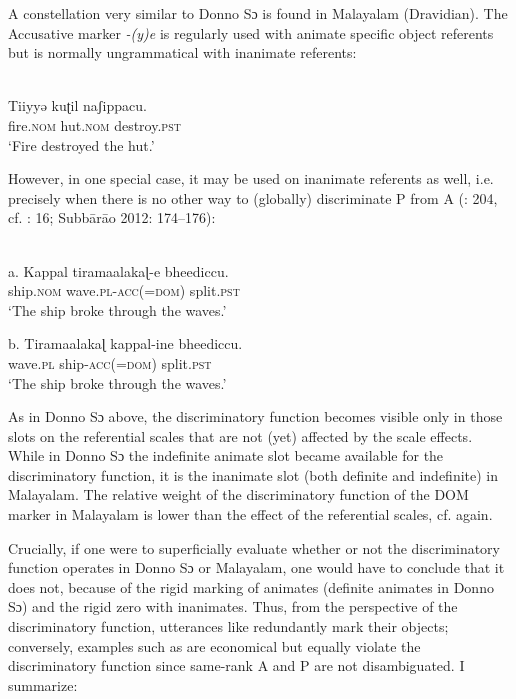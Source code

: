 \documentclass[output=paper]{langsci/langscibook}
\begin{document}
A constellation very similar to Donno Sɔ is found in Malayalam (Dravidian). The Accusative marker \textit{{}-(y)e} is regularly used with animate specific object referents but is normally ungrammatical with inanimate referents: 

\ea\label{ex:serzant:}
\\
\gll Tiiyyǝ       kuʈil   naʃippacu.\\
     fire.\textsc{nom}  hut.\textsc{nom}   destroy.\textsc{pst}\\
\glt ‘Fire destroyed the hut.’
\z

However, in one special case, it may be used on inanimate referents as well, i.e. precisely when there is no other way to (globally) discriminate P from A (\citealt{AsherKumari1997}: 204, cf. \citealt{Stiebels2002}: 16; Subbārāo 2012: 174\-–176):

\ea\label{ex:serzant:}
\\
\gll \textup{a.} Kappal   tiramaalakaɭ{}-e   bheediccu.\\
     ship.\textsc{nom}   wave.\textsc{pl-acc(=dom)}  split.\textsc{pst}\\
\glt ‘The ship broke through the waves.’
\z

\ea
\gll \textup{b.} Tiramaalakaɭ kappal-ine     bheediccu.\\
     wave.\textsc{pl}     ship-\textsc{acc(=dom)}   split.\textsc{pst}\\
\glt ‘The ship broke through the waves.’
\z

As in Donno Sɔ above, the discriminatory function becomes visible only in those slots on the referential scales that are not (yet) affected by the scale effects. While in Donno Sɔ the indefinite animate slot became available for the discriminatory function, it is the inanimate slot (both definite and indefinite) in Malayalam. The relative weight of the discriminatory function of the DOM marker in Malayalam is lower than the effect of the referential scales, cf.  again. 

Crucially, if one were to superficially evaluate whether or not the discriminatory function operates in Donno Sɔ or Malayalam, one would have to conclude that it does not, because of the rigid marking of animates (definite animates in Donno Sɔ) and the rigid zero with inanimates. Thus, from the perspective of the discriminatory function, utterances like  redundantly mark their objects; conversely, examples such as  are economical but equally violate the discriminatory function since same-rank A and P are not disambiguated. I summarize:
\end{document}
